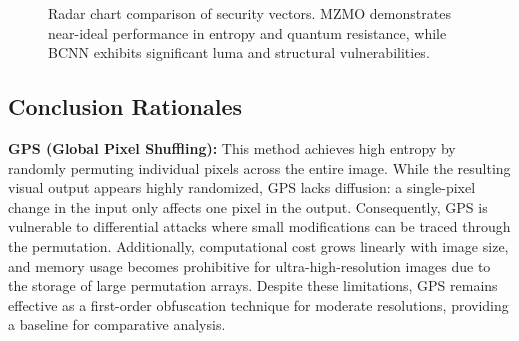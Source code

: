 \documentclass[12pt,fleqn]{article}
\begin{document}
\begin{figure}[htbp]
\centering
{}
\caption{Radar chart comparison of security vectors. MZMO demonstrates near-ideal performance in entropy and quantum resistance, while BCNN exhibits significant luma and structural vulnerabilities.}
\end{figure}

\subsection{Conclusion Rationales}

\textbf{GPS (Global Pixel Shuffling):}  
This method achieves high entropy by randomly permuting individual pixels across the entire image. While the resulting visual output appears highly randomized, GPS lacks diffusion: a single-pixel change in the input only affects one pixel in the output. Consequently, GPS is vulnerable to differential attacks where small modifications can be traced through the permutation. Additionally, computational cost grows linearly with image size, and memory usage becomes prohibitive for ultra-high-resolution images due to the storage of large permutation arrays. Despite these limitations, GPS remains effective as a first-order obfuscation technique for moderate resolutions, providing a baseline for comparative analysis.
\end{document}
